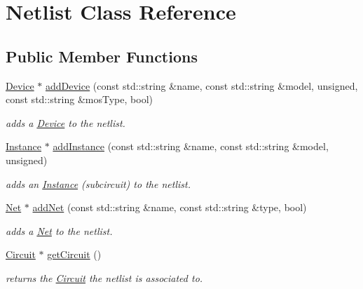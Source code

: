 \hypertarget{class_open_chams_1_1_netlist}{}\section{Netlist Class Reference}
\label{class_open_chams_1_1_netlist}
\subsection*{Public Member Functions}
\begin{DoxyCompactItemize}
\item 
\hyperlink{class_open_chams_1_1_device}{Device} $\ast$ \hyperlink{class_open_chams_1_1_netlist_a8e1798a2516c32fbab629ce8d60d4b1d}{add\+Device} (const std\+::string \&name, const std\+::string \&model, unsigned, const std\+::string \&mos\+Type, bool)
\begin{DoxyCompactList}\small\item\em adds a \hyperlink{class_open_chams_1_1_device}{Device} to the netlist. \end{DoxyCompactList}\item 
\hyperlink{class_open_chams_1_1_instance}{Instance} $\ast$ \hyperlink{class_open_chams_1_1_netlist_af0fb73e5e8589a64d13b6d8104a34a03}{add\+Instance} (const std\+::string \&name, const std\+::string \&model, unsigned)
\begin{DoxyCompactList}\small\item\em adds an \hyperlink{class_open_chams_1_1_instance}{Instance} (subcircuit) to the netlist. \end{DoxyCompactList}\item 
\hyperlink{class_open_chams_1_1_net}{Net} $\ast$ \hyperlink{class_open_chams_1_1_netlist_a52be455a704925328843770552eca43d}{add\+Net} (const std\+::string \&name, const std\+::string \&type, bool)
\begin{DoxyCompactList}\small\item\em adds a \hyperlink{class_open_chams_1_1_net}{Net} to the netlist. \end{DoxyCompactList}\item 
\mbox{\label{class_open_chams_1_1_netlist_a01673b4356977793545c5f3a55ceaba5}} 
\hyperlink{class_open_chams_1_1_circuit}{Circuit} $\ast$ \hyperlink{class_open_chams_1_1_netlist_a01673b4356977793545c5f3a55ceaba5}{get\+Circuit} ()
\begin{DoxyCompactList}\small\item\em returns the \hyperlink{class_open_chams_1_1_circuit}{Circuit} the netlist is associated to. \end{DoxyCompactList}\item 

\end{DoxyCompactItemize}
